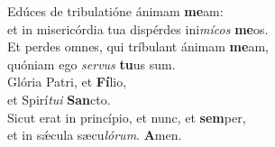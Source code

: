 \oddverse Edúces de tribulatióne ánimam \textbf{me}am:~\*\\
\oddverse et in misericórdia tua dispérdes ini\textit{mí}\textit{cos} \textbf{me}os.\\
\evenverse Et perdes omnes, qui tríbulant ánimam \textbf{me}am,~\*\\
\evenverse quóniam ego \textit{ser}\textit{vus} \textbf{tu}us sum.\\
\oddverse Glória Patri, et \textbf{Fí}lio,~\*\\
\oddverse et Spirí\textit{tu}\textit{i} \textbf{San}cto.\\
\evenverse Sicut erat in princípio, et nunc, et \textbf{sem}per,~\*\\
\evenverse et in sǽcula sæcu\textit{ló}\textit{rum}. \textbf{A}men.\\
